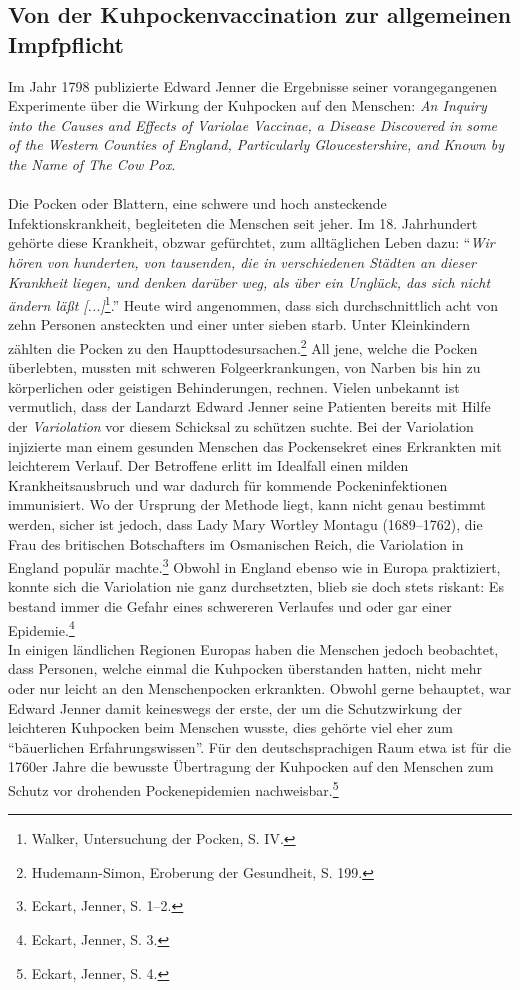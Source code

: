 \documentclass[
    a4paper,
    12pt,
    hyphens,
    chapterprefix=true,
    headheight=33pt,
    footheight=29pt,
    headings=optiontohead, %
]{scrartcl}
\begin{document}
\subsection{Von der Kuhpockenvaccination zur allgemeinen Impfpflicht}
Im Jahr 1798 publizierte Edward Jenner die Ergebnisse seiner vorangegangenen Experimente über die Wirkung der Kuhpocken auf den Menschen: \textit{An Inquiry into the Causes and Effects of Variolae Vaccinae, a Disease Discovered in some of the Western Counties of England, Particularly Gloucestershire, and Known by the Name of The Cow Pox}.\\
\\
Die Pocken oder Blattern, eine schwere und hoch ansteckende Infektionskrankheit, begleiteten die Menschen seit jeher. Im 18. Jahrhundert gehörte diese Krankheit, obzwar gefürchtet, zum alltäglichen Leben dazu: "`\textit{Wir hören von hunderten, von tausenden, die in verschiedenen Städten an dieser Krankheit liegen, und denken darüber weg, als über ein Unglück, das sich nicht ändern läßt [...]}\footnote{Walker, Untersuchung der Pocken, S. IV.}."'
 Heute wird angenommen, dass sich durchschnittlich acht von zehn Personen ansteckten und einer unter sieben starb. Unter Kleinkindern zählten die Pocken zu den Haupttodesursachen.\footnote{Hudemann-Simon,
Eroberung der Gesundheit, S. 199.} All jene, welche die Pocken überlebten, mussten mit schweren Folgeerkrankungen, von Narben bis hin zu körperlichen oder geistigen Behinderungen, rechnen. Vielen unbekannt ist vermutlich, dass der Landarzt Edward Jenner seine Patienten bereits mit Hilfe der \textit{Variolation} vor diesem Schicksal zu schützen suchte. Bei der Variolation injizierte man einem gesunden Menschen das Pockensekret eines Erkrankten mit leichterem Verlauf. Der Betroffene erlitt im Idealfall einen milden Krankheitsausbruch und war dadurch für kommende Pockeninfektionen immunisiert. Wo der Ursprung der Methode liegt, kann nicht genau bestimmt werden, sicher ist jedoch, dass Lady Mary Wortley Montagu (1689--1762), die Frau des britischen Botschafters im Osmanischen Reich, die Variolation in England populär machte.\footnote{Eckart, Jenner, S. 1--2.} Obwohl in England ebenso wie in Europa praktiziert, konnte sich die Variolation nie ganz durchsetzten, blieb sie doch stets riskant: Es bestand immer die Gefahr eines schwereren Verlaufes und oder gar einer Epidemie.\footnote{Eckart, Jenner, S. 3.}\\
In einigen ländlichen Regionen Europas haben die Menschen jedoch beobachtet, dass Personen, welche einmal die Kuhpocken überstanden hatten, nicht mehr oder nur leicht an den Menschenpocken erkrankten. Obwohl gerne behauptet, war Edward Jenner damit keineswegs der erste, der um die Schutzwirkung der leichteren Kuhpocken beim Menschen wusste, dies gehörte viel eher zum "`bäuerlichen Erfahrungswissen"'. Für den deutschsprachigen Raum etwa ist für die 1760er Jahre die bewusste Übertragung der Kuhpocken auf den Menschen zum Schutz vor drohenden Pockenepidemien nachweisbar.\footnote{Eckart, Jenner, S. 4.}
\end{document}
